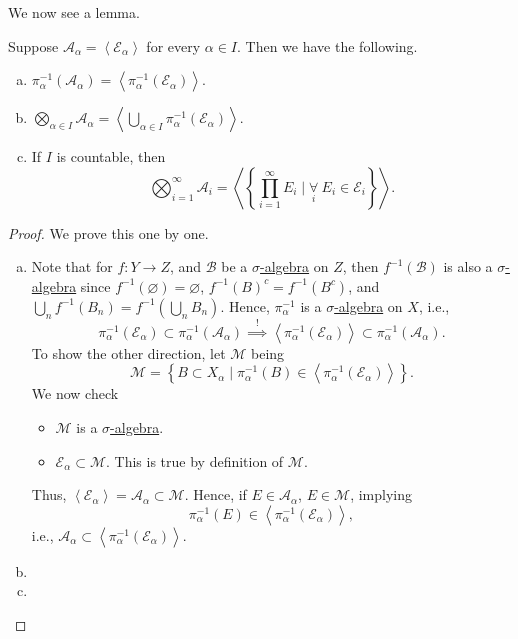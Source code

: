 We now see a lemma.
\begin{lemma}
	Suppose \(\mathcal{A} _\alpha  = \left< \mathcal{E} _\alpha  \right> \) for every \(\alpha \in I\). Then we have the following.
	\begin{enumerate}[(a)]
		\item \(\pi _\alpha ^{-1} (\mathcal{A} _\alpha ) = \left< \pi ^{-1} _\alpha (\mathcal{E} _\alpha ) \right> \).
		\item \(\bigotimes_{\alpha \in I} \mathcal{A} _\alpha = \left< \bigcup_{\alpha \in I} \pi _\alpha ^{-1} (\mathcal{E} _\alpha )\right> \).
		\item If \(I\) is countable, then
		      \[
			      \bigotimes_{i=1}^{\infty }\mathcal{A} _i = \left< \left\{\prod_{i=1}^{\infty} E_{i} \mid \underset{i}{\forall}\ E_{i}\in \mathcal{E} _{i}\right\} \right>.
		      \]
	\end{enumerate}
\end{lemma}
\begin{proof}
	We prove this one by one.
	\begin{enumerate}[(a)]
		\item Note that for \(f\colon Y\to Z\), and \(\mathcal{B} \) be a \hyperref[def:sigma-algebra]{\(\sigma\)-algebra} on \(Z\), then \(f^{-1} (\mathcal{B} )\) is also a \hyperref[def:sigma-algebra]{\(\sigma\)-algebra} since \(f^{-1} (\varnothing ) = \varnothing\), \(f^{-1} (B)^{c} = f^{-1} (B^{c} )\), and \(\bigcup_{n} f^{-1} (B_{n}) = f^{-1} (\bigcup_{n}B_{n})\). Hence, \(\pi ^{-1}_\alpha \) is a \hyperref[def:sigma-algebra]{\(\sigma\)-algebra} on \(X\), i.e.,
		      \[
			      \pi _\alpha ^{-1} (\mathcal{E} _\alpha )\subset \pi _\alpha ^{-1} (\mathcal{A} _\alpha )\overset{\hyperref[lma:lec2-1]{!}}{\implies} \left< \pi ^{-1} _\alpha (\mathcal{E} _\alpha ) \right> \subset \pi _\alpha ^{-1} (\mathcal{A} _\alpha ).
		      \]
		      To show the other direction, let \(\mathcal{M} \) being
		      \[
			      \mathcal{M} = \left\{B\subset X_\alpha  \mid \pi _\alpha ^{-1} (B)\in \left< \pi _\alpha ^{-1} (\mathcal{E} _\alpha ) \right> \right\}.
		      \]
		      We now check
		      \begin{itemize}
			      \item \(\mathcal{M} \) is a \hyperref[def:sigma-algebra]{\(\sigma\)-algebra}. 
			      \item \(\mathcal{E} _\alpha \subset \mathcal{M}\). This is true by definition of \(\mathcal{M} \).
		      \end{itemize}
		      Thus, \(\left< \mathcal{E} _\alpha \right> = \mathcal{A} _\alpha \subset \mathcal{M} \). Hence, if \(E\in \mathcal{A} _\alpha \), \(E\in \mathcal{M} \), implying
		      \[
			      \pi _\alpha ^{-1} (E)\in \left< \pi _\alpha ^{-1} (\mathcal{E} _\alpha ) \right>,
		      \]
		      i.e., \(\mathcal{A} _\alpha \subset \left< \pi_\alpha ^{-1} (\mathcal{E} _\alpha ) \right> \).
		\item {}
		\item {}
	\end{enumerate}
\end{proof}

